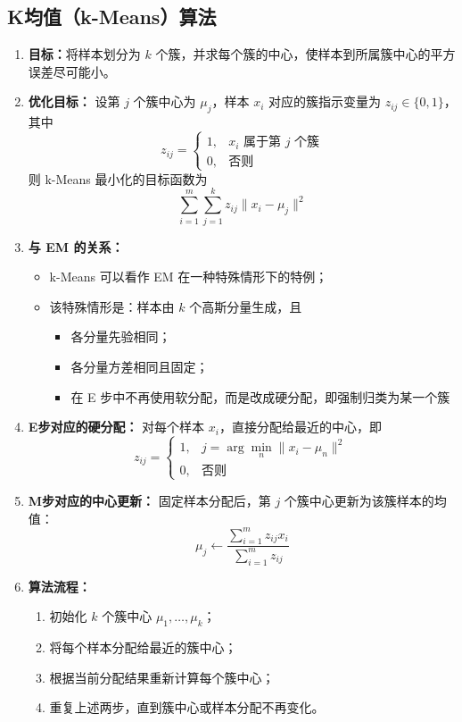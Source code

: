 \documentclass[../main.tex]{subfiles}
\begin{document}
\subsection{K均值（k-Means）算法}\label{sec:k-means}
\begin{enumerate}
    \item \textbf{目标：}将样本划分为 $k$ 个簇，并求每个簇的中心，使样本到所属簇中心的平方误差尽可能小。

    \item \textbf{优化目标：}
    设第 $j$ 个簇中心为 $\mu_j$，样本 $x_i$ 对应的簇指示变量为 $z_{ij}\in\{0,1\}$，其中
    $$
    z_{ij}=
    \begin{cases}
    1, & x_i \text{ 属于第 } j \text{ 个簇}\\
    0, & \text{否则}
    \end{cases}
    $$
    则 k-Means 最小化的目标函数为
    $$
    \sum_{i=1}^{m}\sum_{j=1}^{k}z_{ij}\|x_i-\mu_j\|^2
    $$

    \item \textbf{与 EM 的关系：}
    \begin{itemize}
        \item k-Means 可以看作 EM 在一种特殊情形下的特例；
        \item 该特殊情形是：样本由 $k$ 个高斯分量生成，且
        \begin{itemize}
            \item 各分量先验相同；
            \item 各分量方差相同且固定；
            \item 在 E 步中不再使用软分配，而是改成硬分配，即强制归类为某一个簇
        \end{itemize}
    \end{itemize}

    \item \textbf{E步对应的硬分配：}
    对每个样本 $x_i$，直接分配给最近的中心，即
    $$
    z_{ij}=
    \begin{cases}
    1, & j=\arg\min\limits_{n}\|x_i-\mu_n\|^2\\
    0, & \text{否则}
    \end{cases}
    $$

    \item \textbf{M步对应的中心更新：}
    固定样本分配后，第 $j$ 个簇中心更新为该簇样本的均值：
    $$
    \mu_j
    \leftarrow
    \frac{\sum_{i=1}^{m}z_{ij}x_i}{\sum_{i=1}^{m}z_{ij}}
    $$

    \item \textbf{算法流程：}
    \begin{enumerate}
        \item 初始化 $k$ 个簇中心 $\mu_1,\ldots,\mu_k$；
        \item 将每个样本分配给最近的簇中心；
        \item 根据当前分配结果重新计算每个簇中心；
        \item 重复上述两步，直到簇中心或样本分配不再变化。
    \end{enumerate}


\end{enumerate}
\end{document}
